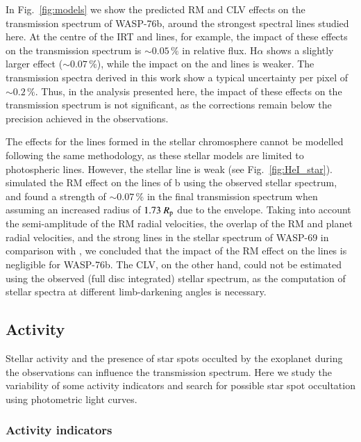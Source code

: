\documentclass{aa}
\begin{document}
In Fig.~\ref{fig:models} we show the predicted RM and CLV effects on the transmission spectrum of WASP-76b, around the strongest spectral lines studied here. At the centre of the  IRT and  lines, for example, the impact of these effects on the transmission spectrum is $\sim 0.05\,\%$ in relative flux. H$\alpha$ shows a slightly larger effect ($\sim 0.07\,\%$), while the impact on the  and  lines is weaker. The transmission spectra derived in this work show a typical uncertainty per pixel of $\sim0.2\,\%$. Thus, in the analysis presented here, the impact of these effects on the transmission spectrum is not significant, as the corrections remain below the precision achieved in the observations.

The effects for the  lines formed in the stellar chromosphere cannot be modelled following the same methodology, as these stellar models are limited to photospheric lines. However, the stellar  line is weak (see Fig.~\ref{fig:HeI_star}). \citet{Nortmann2018Science} simulated the RM effect on the  lines of b using the observed stellar spectrum, and found a strength of $\sim 0.07\,\%$ in the final transmission spectrum when assuming an increased radius of $1.73~R_{\rm p}$ due to the  envelope. Taking into account the semi-amplitude of the RM radial velocities, the overlap of the RM and planet radial velocities, and the strong  lines in the stellar spectrum of WASP-69 in comparison with , we concluded that the impact of the RM effect on the  lines is negligible for WASP-76b. {The CLV, on the other hand, could not be estimated using the observed (full disc integrated) stellar spectrum, as the computation of stellar spectra at different limb-darkening angles is necessary.}

\subsection{Activity} \label{sec:activity}

Stellar activity and the presence of star spots occulted by the exoplanet during the observations can influence the transmission spectrum. Here we study the variability of some activity indicators and search for possible star spot occultation using photometric light curves. 

\subsubsection{Activity indicators}
\end{document}
